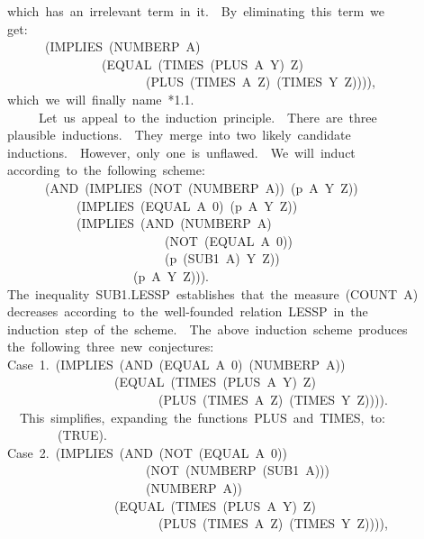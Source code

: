 \documentclass[11pt]{book}
\newenvironment{pubasis}{\begin{flushleft}\ttfamily\small}{\normalsize\rmfamily\end{flushleft}}
\begin{document}
\begin{pubasis}
~~which~has~an~irrelevant~term~in~it.~~By~eliminating~this~term~we\\
~~get:\\

~~~~~~~~(IMPLIES~(NUMBERP~A)\\
~~~~~~~~~~~~~~~~~(EQUAL~(TIMES~(PLUS~A~Y)~Z)\\
~~~~~~~~~~~~~~~~~~~~~~~~(PLUS~(TIMES~A~Z)~(TIMES~Y~Z)))),\\

~~which~we~will~finally~name~*1.1.\\

~~~~~~~Let~us~appeal~to~the~induction~principle.~~There~are~three\\
~~plausible~inductions.~~They~merge~into~two~likely~candidate\\
~~inductions.~~However,~only~one~is~unflawed.~~We~will~induct\\
~~according~to~the~following~scheme:\\
~~~~~~~~(AND~(IMPLIES~(NOT~(NUMBERP~A))~(p~A~Y~Z))\\
~~~~~~~~~~~~~(IMPLIES~(EQUAL~A~0)~(p~A~Y~Z))\\
~~~~~~~~~~~~~(IMPLIES~(AND~(NUMBERP~A)\\
~~~~~~~~~~~~~~~~~~~~~~~~~~~(NOT~(EQUAL~A~0))\\
~~~~~~~~~~~~~~~~~~~~~~~~~~~(p~(SUB1~A)~Y~Z))\\
~~~~~~~~~~~~~~~~~~~~~~(p~A~Y~Z))).\\
~~The~inequality~SUB1.LESSP~establishes~that~the~measure~(COUNT~A)\\
~~decreases~according~to~the~well-founded~relation~LESSP~in~the\\
~~induction~step~of~the~scheme.~~The~above~induction~scheme~produces\\
~~the~following~three~new~conjectures:\\

~~Case~1.~(IMPLIES~(AND~(EQUAL~A~0)~(NUMBERP~A))\\
~~~~~~~~~~~~~~~~~~~(EQUAL~(TIMES~(PLUS~A~Y)~Z)\\
~~~~~~~~~~~~~~~~~~~~~~~~~~(PLUS~(TIMES~A~Z)~(TIMES~Y~Z)))).\\

~~~~This~simplifies,~expanding~the~functions~PLUS~and~TIMES,~to:\\

~~~~~~~~~~(TRUE).\\

~~Case~2.~(IMPLIES~(AND~(NOT~(EQUAL~A~0))\\
~~~~~~~~~~~~~~~~~~~~~~~~(NOT~(NUMBERP~(SUB1~A)))\\
~~~~~~~~~~~~~~~~~~~~~~~~(NUMBERP~A))\\
~~~~~~~~~~~~~~~~~~~(EQUAL~(TIMES~(PLUS~A~Y)~Z)\\
~~~~~~~~~~~~~~~~~~~~~~~~~~(PLUS~(TIMES~A~Z)~(TIMES~Y~Z)))),\\


\end{pubasis}
\end{document}
